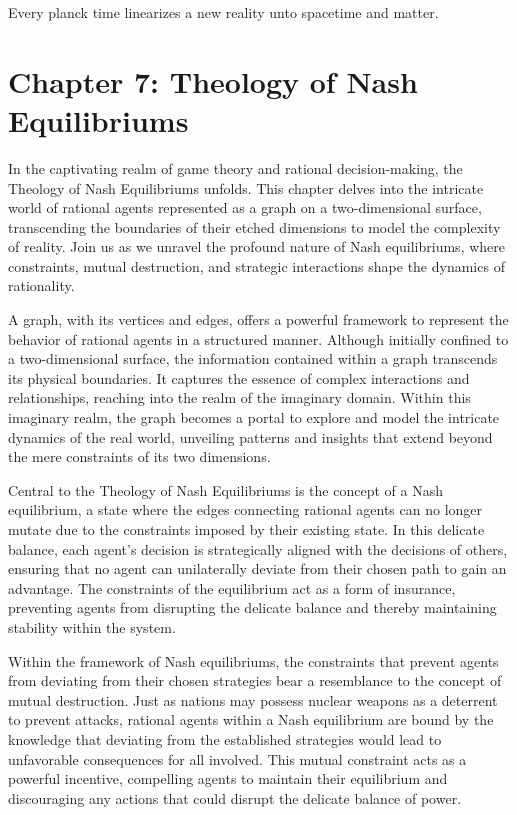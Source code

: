 \documentclass[ebook,12pt,oneside,openany]{memoir}
\begin{document}
\indent Every planck time linearizes a new reality unto spacetime and matter.
\chapter*{Chapter 7: Theology of Nash Equilibriums}


\indent \indent In the captivating realm of game theory and rational decision-making, the Theology of Nash Equilibriums unfolds. This chapter delves into the intricate world of rational agents represented as a graph on a two-dimensional surface, transcending the boundaries of their etched dimensions to model the complexity of reality. Join us as we unravel the profound nature of Nash equilibriums, where constraints, mutual destruction, and strategic interactions shape the dynamics of rationality.

\indent A graph, with its vertices and edges, offers a powerful framework to represent the behavior of rational agents in a structured manner. Although initially confined to a two-dimensional surface, the information contained within a graph transcends its physical boundaries. It captures the essence of complex interactions and relationships, reaching into the realm of the imaginary domain. Within this imaginary realm, the graph becomes a portal to explore and model the intricate dynamics of the real world, unveiling patterns and insights that extend beyond the mere constraints of its two dimensions.

\indent Central to the Theology of Nash Equilibriums is the concept of a Nash equilibrium, a state where the edges connecting rational agents can no longer mutate due to the constraints imposed by their existing state. In this delicate balance, each agent's decision is strategically aligned with the decisions of others, ensuring that no agent can unilaterally deviate from their chosen path to gain an advantage. The constraints of the equilibrium act as a form of insurance, preventing agents from disrupting the delicate balance and thereby maintaining stability within the system.

\indent Within the framework of Nash equilibriums, the constraints that prevent agents from deviating from their chosen strategies bear a resemblance to the concept of mutual destruction. Just as nations may possess nuclear weapons as a deterrent to prevent attacks, rational agents within a Nash equilibrium are bound by the knowledge that deviating from the established strategies would lead to unfavorable consequences for all involved. This mutual constraint acts as a powerful incentive, compelling agents to maintain their equilibrium and discouraging any actions that could disrupt the delicate balance of power.
\end{document}
